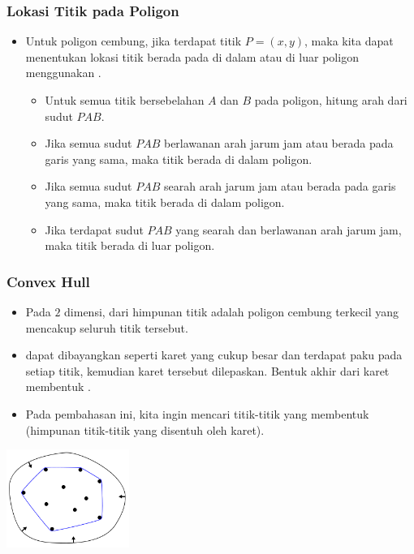 \begin{frame}
\frametitle{Lokasi Titik pada Poligon}
\begin{itemize}
  \item Untuk poligon cembung, jika terdapat titik $P = (x, y)$, maka kita dapat menentukan lokasi titik berada pada di dalam atau di luar poligon menggunakan \fcrossProduct.
  \begin{itemize}
    \item Untuk semua titik bersebelahan $A$ dan $B$ pada poligon, hitung arah dari sudut $PAB$.
    \item Jika semua sudut $PAB$ berlawanan arah jarum jam atau berada pada garis yang sama, maka titik berada di dalam poligon.
    \item Jika semua sudut $PAB$ searah arah jarum jam atau berada pada garis yang sama, maka titik berada di dalam poligon.
    \item Jika terdapat sudut $PAB$ yang searah dan berlawanan arah jarum jam, maka titik berada di luar poligon.
  \end{itemize}
\end{itemize}
\end{frame}

\begin{frame}
\frametitle{Convex Hull}
\begin{itemize}
  \item Pada $2$ dimensi,  dari himpunan titik adalah poligon cembung terkecil yang mencakup seluruh titik tersebut.
  \item \fConvexHull dapat dibayangkan seperti karet yang cukup besar dan terdapat paku pada setiap titik, kemudian karet tersebut dilepaskan. Bentuk akhir dari karet membentuk \fconvexHull.
  \item Pada pembahasan ini, kita ingin mencari titik-titik yang membentuk \fconvexHull (himpunan titik-titik yang disentuh oleh karet).
\end{itemize}
\begin{center}
  \includegraphics[width=4cm]{asset/convex-hull.png}
\end{center}
\end{frame}

